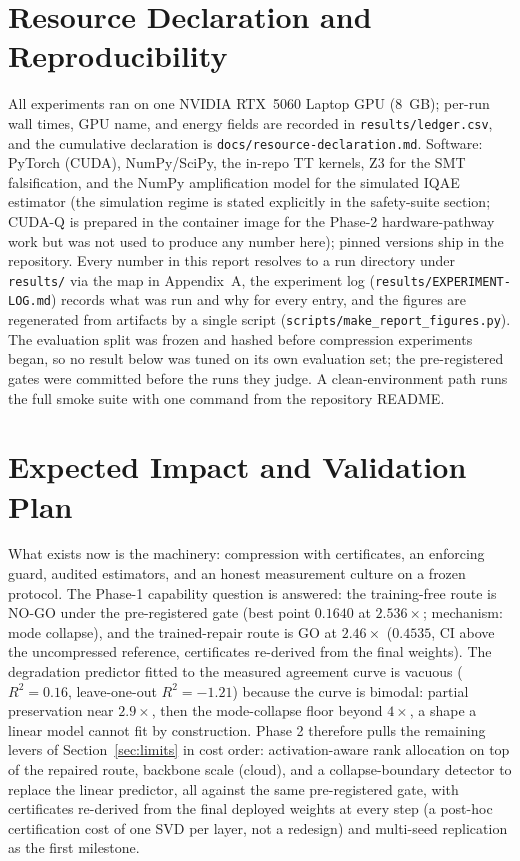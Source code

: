 \documentclass[conference,10pt]{IEEEtran}
\begin{document}
\section{Resource Declaration and Reproducibility}
\label{sec:resources}

All experiments ran on one NVIDIA RTX~5060 Laptop GPU (8~GB); per-run wall
times, GPU name, and energy fields are recorded in
\texttt{results/ledger.csv}, and the cumulative declaration is
\texttt{docs/resource-declaration.md}. Software: PyTorch (CUDA), NumPy/SciPy,
the in-repo TT kernels, Z3 for the SMT falsification, and the NumPy
amplification model for the simulated IQAE estimator (the simulation regime is
stated explicitly in the safety-suite section; CUDA-Q is prepared in the
container image for the Phase-2 hardware-pathway work but was not used to
produce any number here); pinned versions ship in the repository. Every
number in this report resolves to a run directory under \texttt{results/}
via the map in Appendix~A, the experiment log
(\texttt{results/EXPERIMENT-LOG.md}) records what was run and why for every
entry, and the figures are regenerated from artifacts by a single script
(\texttt{scripts/make\_report\_figures.py}). The evaluation split was frozen
and hashed before compression experiments began, so no result below was
tuned on its own evaluation set; the pre-registered gates were committed
before the runs they judge. A clean-environment path runs the full smoke
suite with one command from the repository README.

\section{Expected Impact and Validation Plan}

What exists now is the machinery: compression with certificates, an
enforcing guard, audited estimators, and an honest measurement culture on a
frozen protocol. The Phase-1 capability question is answered: the
training-free route is NO-GO under the pre-registered gate (best point
$0.1640$ at $2.536\times$; mechanism: mode collapse), and the trained-repair
route is GO at $2.46\times$ ($0.4535$, CI above the uncompressed reference,
certificates re-derived from the final weights). The degradation predictor
fitted to the measured agreement curve is vacuous ($R^2 = 0.16$,
leave-one-out $R^2 = -1.21$) because the curve is bimodal: partial
preservation near $2.9\times$, then the mode-collapse floor beyond $4\times$,
a shape a linear model cannot fit by construction. Phase 2 therefore
pulls the remaining levers of Section~\ref{sec:limits} in cost order:
activation-aware rank allocation on top of the repaired route, backbone
scale (cloud), and a collapse-boundary detector to replace the linear
predictor, all against the same pre-registered gate, with certificates
re-derived from the final deployed weights at every step (a post-hoc
certification cost of one SVD per layer, not a redesign) and multi-seed
replication as the first milestone.
\end{document}
